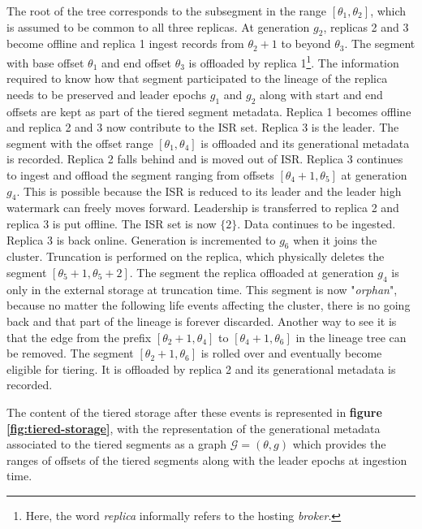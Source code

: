 \documentclass{article}
\begin{document}
\begin{outline}[enumerate]
\1 The root of the tree corresponds to the subsegment in the range $[\theta_1, \theta_2]$, which is assumed to be common to all three replicas.
\1 At generation $g_2$, replicas 2 and 3 become offline and replica 1 ingest records from $\theta_{2} + 1$ to beyond $\theta_3$. The segment with base offset $\theta_1$ and end offset $\theta_3$ is offloaded by replica 1\footnote{Here, the word \textit{replica} informally refers to the hosting \textit{broker}.}. The information required to know how that segment participated to the lineage of the replica needs to be preserved and leader epochs $g_1$ and $g_2$ along with start and end offsets are kept as part of the tiered segment metadata.
\1 Replica 1 becomes offline and replica 2 and 3 now contribute to the ISR set. Replica 3 is the leader. The segment with the offset range $[\theta_1, \theta_4]$ is offloaded and its generational metadata is recorded.
\1 Replica 2 falls behind and is moved out of ISR. Replica 3 continues to ingest and offload the segment ranging from offsets $[\theta_4 + 1, \theta_5]$ at generation $g_4$. This is possible because the ISR is reduced to its leader and the leader high watermark can freely moves forward.
\1 Leadership is transferred to replica 2 and replica 3 is put offline. The ISR set is now $\{2\}$. Data continues to be ingested.
\1 Replica 3 is back online. Generation is incremented to $g_6$ when it joins the cluster. Truncation is performed on the replica, which physically deletes the segment $[\theta_{5}+1, \theta_{5}+2]$. The segment the replica offloaded at generation $g_4$ is only in the external storage at truncation time. This segment is now "\textit{orphan}", because no matter the following life events affecting the cluster, there is no going back and that part of the lineage is forever discarded. Another way to see it is that the edge from the prefix $[\theta_2+1,\theta_4]$ to $[\theta_4+1,\theta_6]$ in the lineage tree can be removed.
\1 The segment $[\theta_2+1,\theta_6]$ is rolled over and eventually become eligible for tiering. It is offloaded by replica 2 and its generational metadata is recorded.
\end{outline}

The content of the tiered storage after these events is represented in \textbf{figure \ref{fig:tiered-storage}}, with the representation of the generational metadata associated to the tiered segments as a graph $\mathcal{G}=(\theta,g)$ which provides the ranges of offsets of the tiered segments along with the leader epochs at ingestion time.
\end{document}
